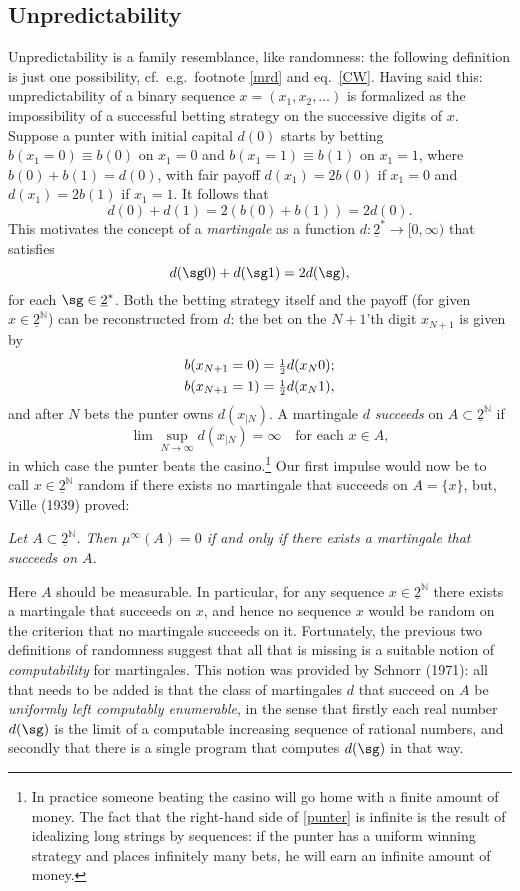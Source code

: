 \documentclass[12pt]{article}
\numberwithin{equation}{section}
\newcommand{\half}{\mbox{\footnotesize $\frac{1}{2}$}}
\newcommand{\er}{\eqref}
\newcommand{\beq}{\begin{equation}}
\newcommand{\eeq}{\end{equation}}
\newcommand{\ul}{\underline}
\newcommand{\raw}{\rightarrow}
\newcommand{\N}{{\mathbb N}} \newcommand{\R}{{\mathbb R}}
\begin{document}
\subsection*{Unpredictability}
Unpredictability is  a family resemblance, like randomness: the following definition is just one possibility, cf.\ e.g.\ footnote \ref{mrd} and eq.\ \er{CW}. Having said this:
unpredictability of a binary sequence $x = (x_1, x_2, \ldots)$ 
is formalized as the impossibility of a successful betting strategy on the successive digits of $x$. Suppose a punter with initial capital $d(0)$ starts by betting
 $b(x_1=0)\equiv b(0)$ on $x_1 = 0$ and $b(x_1 = 1)\equiv b(1)$ on $x_1 = 1$, where $b(0) + b(1) = d(0)$, with fair payoff $d(x_1) = 2b(0)$  if $x_1 = 0$ and $d(x_1) = 2b(1)$ if $x_1 = 1$. It follows that  
 \beq
 d(0) +  d(1) =2( b(0) + b(1)) = 2d(0). \label{M0}
 \eeq 
 This motivates  the concept of a \emph{martingale} as a function $d: \ul{2}^*\raw[0,\infty)$ that satisfies 
 \begin{equation}
d(\sg 0)+d(\sg 1)=2d(\sg),\label{M1}
\end{equation}
 for each $\sg\in \ul{2}^*$. Both the betting strategy itself and the payoff (for given $x\in \ul{2}^{\N}$) can be reconstructed from $d$: the bet on the $N+1$'th digit $x_{N+1}$ is given by
 \begin{align}
 b(x_{N+1}=0)&=\half d(x_{N}0);\\
 b(x_{N+1}=1)&=\half d(x_{N}1),
 \end{align} 
and after $N$ bets the punter owns $d(x_{|N})$. A martingale $d$ \emph{succeeds} on $A\subset \ul{2}^{\N}$ if
\begin{equation}
\lim\sup_{N\raw\infty} d(x_{|N})=\infty \:\:\: \mbox{ for each } x\in A, \label{punter}
\end{equation}
in which case the punter beats the casino.\footnote{In practice someone beating the casino will go home with a finite amount of money. The fact that the right-hand side of \er{punter} is infinite is the result of idealizing long strings by sequences: if the punter  has a uniform winning strategy and places infinitely many bets, he will earn an infinite amount of money. }
Our first impulse would now be to call $x\in \ul{2}^{\N}$ random if there exists no martingale that succeeds on $A=\{x\}$, but,  Ville (1939) proved:
\begin{center}
\emph{ Let $A\subset \ul{2}^{\N}$. Then $\mu^{\infty}(A)=0$ if and only if there exists a martingale that succeeds on $A$.}
\end{center}
Here $A$ should be measurable. In particular, for any sequence $x\in \ul{2}^{\N}$ there exists a martingale that succeeds on $x$, and hence no sequence $x$ would be random on the criterion that no martingale succeeds on it.  Fortunately, the previous two definitions of randomness suggest that all that is missing is a suitable notion of \emph{computability} for martingales.
This notion was provided by Schnorr (1971): all that needs to be added is that the class of martingales $d$ that succeed on $A$ be \emph{uniformly left computably enumerable}, in the sense that  firstly each real number $d(\sg)$ 
 is the limit of a computable increasing sequence of rational numbers, and secondly that there is a single program that computes $d(\sg)$ in that way. 
 
\end{document}
